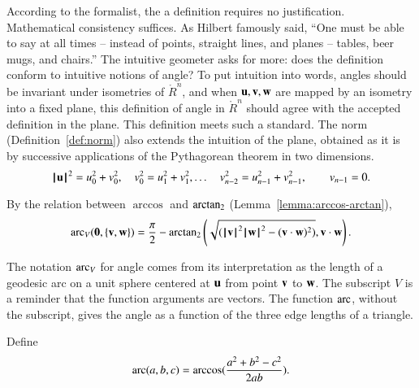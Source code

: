 \begin{tidbit}
  According to the formalist, the a definition requires no
  justification.  Mathematical consistency suffices.  As Hilbert
  famously said, ``One must be able to say at all times -- instead of
  points, straight lines, and planes -- tables, beer mugs, and
  chairs.''  The intuitive geometer asks for more: does the definition
  conform to intuitive notions of angle?  To put intuition into
  words, angles should be invariant under isometries of $\ring{R}^n$,
  and when ${\mathbf u},{\mathbf v},{\mathbf w}$ are mapped by an isometry into a fixed plane,
  this definition of angle in $\ring{R}^n$ should agree with the
  accepted definition in the plane.  This
  definition meets such a standard.  The norm (Definition~\ref{def:norm}) also
  extends the intuition of the plane, obtained as it is by successive
  applications of the Pythagorean theorem in two dimensions.
\[
{{\hskip0.1em|\hskip-0.15em|\hskip0.1em}{\mathbf u}{\hskip0.1em|\hskip-0.15em|\hskip0.1em}}^2 = u_0^2 + v_0^2,\quad v_0^2 = u_1^2 + v_1^2,\ldots
\quad v_{n-2}^2 = u_{n-1}^2 + v_{n-1}^2,\qquad v_{n-1}=0.
\]
\end{tidbit}

By the relation between $\arccos$ and ${\operatorname{arctan_2}}$
(Lemma~\ref{lemma:arccos-arctan}), %
\begin{equation}\label{eqn:angle}
  \operatorname{arc}_V({\mathbf 0},\{{\mathbf v},{\mathbf w}\}) = \frac{\pi}2 - {\operatorname{arctan_2}}\left ({\sqrt{({{\hskip0.1em|\hskip-0.15em|\hskip0.1em}{\mathbf v}{\hskip0.1em|\hskip-0.15em|\hskip0.1em}}^2{{\hskip0.1em|\hskip-0.15em|\hskip0.1em}{\mathbf w}{\hskip0.1em|\hskip-0.15em|\hskip0.1em}}^2 -
        ({\mathbf v}\cdot {\mathbf w})^2)}}, {{\mathbf v}\cdot {\mathbf w}}\right).
\end{equation}
%

The notation $\operatorname{arc}_V$ for angle comes from its interpretation as the
length of a geodesic arc on a unit sphere
centered at ${\mathbf u}$ from point ${\mathbf v}$ to ${\mathbf w}$.
%
The subscript $V$ is a reminder that
the function arguments are vectors.  The function
$\operatorname{arc}$, without the subscript,  gives the angle as a function
of the three edge lengths of a triangle.
%
%
%


\begin{definition}[arc]\label{def:arc}
Define
\begin{displaymath}\operatorname{arc}(a,b,c) = \arccos(\frac{a^2 + b^2 - c^2}{2 a
    b}).\end{displaymath}
%
\end{definition}

